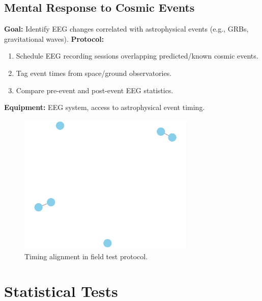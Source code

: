 \documentclass[11pt,a4paper]{article}
\begin{document}
\subsection{Mental Response to Cosmic Events}
\textbf{Goal:} Identify EEG changes correlated with astrophysical events (e.g., GRBs, gravitational waves).
\textbf{Protocol:}
\begin{enumerate}
 \item Schedule EEG recording sessions overlapping predicted/known cosmic events.
 \item Tag event times from space/ground observatories.
 \item Compare pre-event and post-event EEG statistics.
\end{enumerate}
\textbf{Equipment:} EEG system, access to astrophysical event timing.
\begin{figure}[h]
    \centering
    \includegraphics[width=0.75\textwidth]{figures/field_schematic.png}
    \caption{Timing alignment in field test protocol.}
\end{figure}

\section{Statistical Tests}
\end{document}
